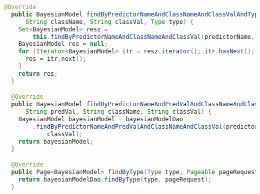 \begin{lstlisting}[language=Java,basicstyle=\tiny,caption=BayesianModelService.java]
  @Override
  public BayesianModel findByPredictorNameAndClassNameAndClassValAndType(String predictorName,
      String className, String classVal, Type type) {
    Set<BayesianModel> resz =
        this.findByPredictorNameAndClassNameAndClassVal(predictorName, className, classVal);
    BayesianModel res = null;
    for (Iterator<BayesianModel> itr = resz.iterator(); itr.hasNext(); ) {
      res = itr.next();
    }
    return res;
  }

  @Override
  public BayesianModel findByPredictorNameAndPredValAndClassNameAndClassVal(String predictorName,
      String predVal, String className, String classVal) {
    BayesianModel bayesianModel = bayesianModelDao
        .findByPredictorNameAndPredValAndClassNameAndClassVal(predictorName, predVal, className,
            classVal);
    return bayesianModel;
  }

  @Override
  public Page<BayesianModel> findByType(Type type, Pageable pageRequest) throws Exception {
    return bayesianModelDao.findByType(type, pageRequest);
  }


\end{lstlisting}
